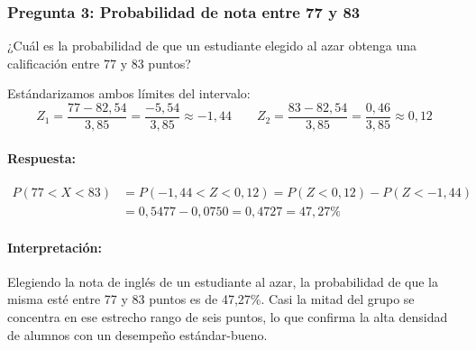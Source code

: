 
\subsubsection{Pregunta 3: Probabilidad de nota entre 77 y 83}

¿Cuál es la probabilidad de que un estudiante elegido al azar obtenga una calificación entre 77
y 83 puntos?

Estándarizamos ambos límites del intervalo:
\begin{equation*}
  Z_1 = \frac{77 - 82{,}54}{3{,}85} = \frac{-5{,}54}{3{,}85} \approx -1{,}44
  \qquad
  Z_2 = \frac{83 - 82{,}54}{3{,}85} = \frac{0{,}46}{3{,}85} \approx 0{,}12
\end{equation*}

\paragraph{Respuesta:}
\begin{equation*}
  \begin{split}
    P(77 < X < 83) &= P(-1{,}44 < Z < 0{,}12) = P(Z < 0{,}12) - P(Z < -1{,}44) \\
                    &= 0{,}5477 - 0{,}0750 = 0{,}4727 = 47{,}27\%
  \end{split}
\end{equation*}

\paragraph{Interpretación:} Elegiendo la nota de inglés de un estudiante al azar, la probabilidad
de que la misma esté entre 77 y 83 puntos es de 47,27\%. Casi la mitad del grupo se concentra en
ese estrecho rango de seis puntos, lo que confirma la alta densidad de alumnos con un desempeño
estándar-bueno.

